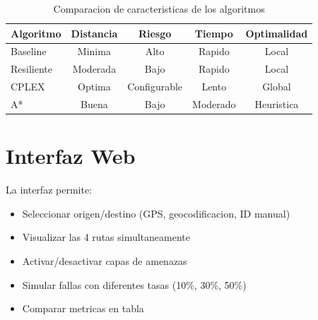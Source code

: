 \documentclass[12pt,a4paper]{article}
\begin{document}
\begin{table}[h]
\centering
\begin{tabular}{@{}lcccc@{}}
\toprule
\textbf{Algoritmo} & \textbf{Distancia} & \textbf{Riesgo} & \textbf{Tiempo} & \textbf{Optimalidad} \\
\midrule
Baseline & Minima & Alto & Rapido & Local \\
Resiliente & Moderada & Bajo & Rapido & Local \\
CPLEX & Optima & Configurable & Lento & Global \\
A* & Buena & Bajo & Moderado & Heuristica \\
\bottomrule
\end{tabular}
\caption{Comparacion de caracteristicas de los algoritmos}
\end{table}

\section{Interfaz Web}

La interfaz permite:
\begin{itemize}
    \item Seleccionar origen/destino (GPS, geocodificacion, ID manual)
    \item Visualizar las 4 rutas simultaneamente
    \item Activar/desactivar capas de amenazas
    \item Simular fallas con diferentes tasas (10\%, 30\%, 50\%)
    \item Comparar metricas en tabla
\end{itemize}
\end{document}
